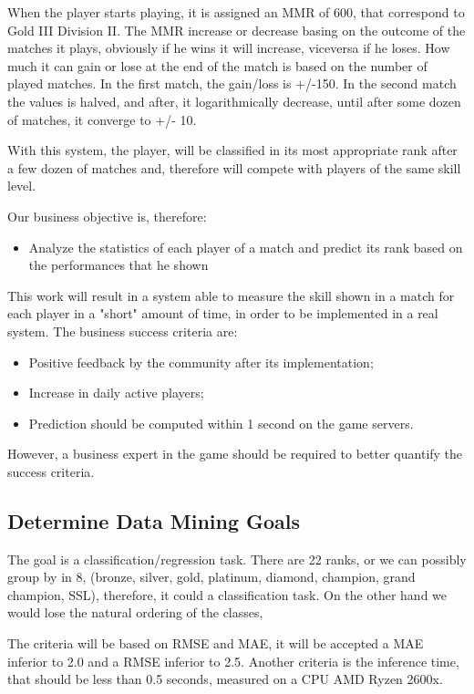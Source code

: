 When the player starts playing, it is assigned an MMR of 600, that correspond to Gold III Division II. The MMR increase or decrease basing on the outcome of the matches it plays, obviously if he wins it will increase, viceversa if he loses. How much it can gain or lose at the end of the match is based on the number of played matches. In the first match, the gain/loss is +/-150. In the second match the values is halved, and after, it logarithmically decrease, until after some dozen of matches, it converge to +/- 10.

With this system, the player, will be classified in its most appropriate rank after a few dozen of matches and, therefore will compete with players of the same skill level.

Our business objective is, therefore:
\begin{itemize}
    \item Analyze the statistics of each player of a match and predict its rank based on the performances that he shown
\end{itemize}


This work will result in a system able to measure the skill shown in a match for each player in a "short" amount of time, in order to be implemented in a real system.
The business success criteria are:
\begin{itemize}
    \item Positive feedback by the community after its implementation;
    \item Increase in daily active players;
    \item Prediction should be computed within 1 second on the game servers.
\end{itemize}

However, a business expert in the game should be required to better quantify the success criteria.

\subsection{Determine Data Mining Goals}
\label{sec:min_goal}
The goal is a classification/regression task. There are 22 ranks, or we can possibly group by in 8, (bronze, silver, gold, platinum, diamond, champion, grand champion, SSL), therefore, it could a classification task. On the other hand we would lose the natural ordering of the classes, 

The criteria will be based on RMSE and MAE, it will be accepted a MAE inferior to 2.0 and a RMSE inferior to 2.5. 
Another criteria is the inference time, that should be less than 0.5 seconds, measured on a CPU AMD Ryzen 2600x.

